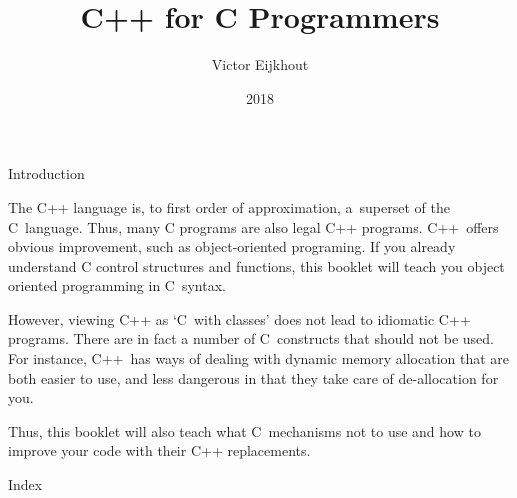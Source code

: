 \documentclass[11pt]{boek3}
\begin{document}
\title{C++ for C Programmers}
\author{Victor Eijkhout}
\date{2018}
\maketitle

\tableofcontents

 {Introduction}

The C++ language is, to first order of approximation, a~superset of
the C~language. Thus, many C programs are also legal C++
programs. C++~offers obvious improvement, such as object-oriented
programing. If you already understand C control structures and
functions, this booklet will teach you object oriented programming in
C~syntax.

However, viewing C++ as `C~with classes' does not lead to
idiomatic C++ programs. There are in fact a number of C~constructs
that should not be used. For instance, C++~has ways of dealing with
dynamic memory allocation that are both easier to use, and less
dangerous in that they take care of de-allocation for you.

Thus, this booklet will also teach what C~mechanisms not to use and
how to improve your code with their C++ replacements.


 {Index}
\begin{multicols}{2}
\printindex
\end{multicols}

\closeout\chapterlist
\end{document}
